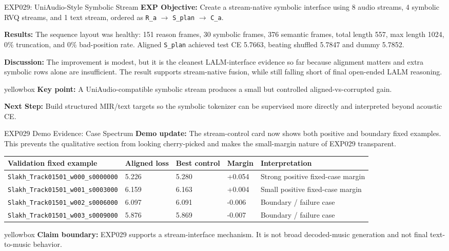 \documentclass[aspectratio=169,11pt]{beamer}
\newcommand{\code}[1]{\texttt{\footnotesize #1}}
\newcommand{\expfield}[2]{\textbf{#1:} #2\par\vspace{0.10cm}}
\newenvironment{keybox}{%
  \begin{beamercolorbox}[rounded=true,sep=0.14cm,wd=\linewidth]{yellowbox}\footnotesize%
}{%
  \end{beamercolorbox}%
}
\begin{document}
\begin{frame}{EXP029: UniAudio-Style Symbolic Stream}
  \footnotesize
  \expfield{EXP Objective}{Create a stream-native symbolic interface using 8 audio streams, 4 symbolic RVQ streams, and 1 text stream, ordered as \code{R\_a} $\rightarrow$ \code{S\_plan} $\rightarrow$ \code{C\_a}.}
  \expfield{Results}{The sequence layout was healthy: 151 reason frames, 30 symbolic frames, 376 semantic frames, total length 557, max length 1024, 0\% truncation, and 0\% bad-position rate. Aligned \code{S\_plan} achieved test CE 5.7663, beating shuffled 5.7847 and dummy 5.7852.}
  \expfield{Discussion}{The improvement is modest, but it is the cleanest LALM-interface evidence so far because alignment matters and extra symbolic rows alone are insufficient. The result supports stream-native fusion, while still falling short of final open-ended LALM reasoning.}
  \begin{keybox}\textbf{Key point:} A UniAudio-compatible symbolic stream produces a small but controlled aligned-vs-corrupted gain.\end{keybox}
  \vspace{0.18cm}
  \expfield{Next Step}{Build structured MIR/text targets so the symbolic tokenizer can be supervised more directly and interpreted beyond acoustic CE.}
\end{frame}

\begin{frame}{EXP029 Demo Evidence: Case Spectrum}
  \footnotesize
  \expfield{Demo update}{The stream-control card now shows both positive and boundary fixed examples. This prevents the qualitative section from looking cherry-picked and makes the small-margin nature of EXP029 transparent.}

  \begin{tabularx}{\linewidth}{p{4.0cm}p{1.45cm}p{1.6cm}p{1.2cm}Y}
    \toprule
    Validation fixed example & Aligned loss & Best control & Margin & Interpretation \\
    \midrule
    \code{Slakh\_Track01501\_w000\_s0000000} & 5.226 & 5.280 & +0.054 & Strong positive fixed-case margin \\
    \code{Slakh\_Track01501\_w001\_s0003000} & 6.159 & 6.163 & +0.004 & Small positive fixed-case margin \\
    \code{Slakh\_Track01501\_w002\_s0006000} & 6.097 & 6.091 & -0.006 & Boundary / failure case \\
    \code{Slakh\_Track01501\_w003\_s0009000} & 5.876 & 5.869 & -0.007 & Boundary / failure case \\
    \bottomrule
  \end{tabularx}

  \vspace{0.18cm}
  \begin{keybox}\textbf{Claim boundary:} EXP029 supports a stream-interface mechanism. It is not broad decoded-music generation and not final text-to-music behavior.\end{keybox}
\end{frame}
\end{document}
